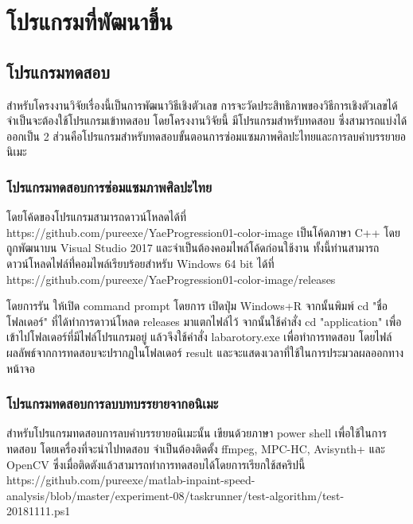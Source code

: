 \chapter{โปรแกรมที่พัฒนาขึ้น}
\section{โปรแกรมทดสอบ}
\hspace{1cm} สำหรับโครงงานวิจัยเรื่องนี้เป็นการพัฒนาวิธีเชิงตัวเลข การจะวัดประสิทธิภาพของวิธีการเชิงตัวเลขได้ จำเป็นจะต้องใช้โปรแกรมเข้าทดสอบ โดยโครงงานวิจัยนี้ มีโปรแกรมสำหรับทดสอบ ซึ่งสามารถแบ่งได้ออกเป็น 2 ส่วนคือโปรแกรมสำหรับทดสอบขั้นตอนการซ่อมแซมภาพศิลปะไทยและการลบคำบรรยายอนิเมะ
\subsection{โปรแกรมทดสอบการซ่อมแซมภาพศิลปะไทย}
\hspace{1cm} โดยโค้ดของโปรแกรมสามารถดาวน์โหลดได้ที่ https://github.com/pureexe/YaeProgression01-color-image เป็นโค้ดภาษา C++ โดยถูกพัฒนาบน Visual Studio 2017 และจำเป็นต้องคอมไพล์โค้ดก่อนใช้งาน ทั้งนี้ท่านสามารถดาวน์โหลดไฟล์ที่่คอมไพล์เรียบร้อยสำหรับ Windows 64 bit ได้ที่ https://github.com/pureexe/YaeProgression01-color-image/releases

\hspace{1cm} โดยการรัน ให้เปิด command prompt โดยการ เปิดปุ่ม Windows+R จากนั้นพิมพ์ cd "ชื่อโฟลเดอร์" ที่ได้ทำการดาวน์โหลด releases มาแตกไฟล์ไว้ จากนั้นใช้คำสั่ง cd "application" เพื่อเข้าไปโฟลเดอร์ที่มีไฟล์โปรแกรมอยู่ แล้วจึงใช้คำสั่ง labarotory.exe เพื่อทำการทดสอบ โดยไฟล์ผลลัพธ์จากการทดสอบจะปรากฏในโฟลเดอร์ result และจะแสดงเวลาที่ใช้ในการประมวลผลออกทางหน้าจอ



\subsection{โปรแกรมทดสอบการลบบทบรรยายจากอนิเมะ}
\hspace{1cm} สำหรับโปรแกรมทดสอบการลบคำบรรยายอนิเมะนั้น เขียนด้วยภาษา power shell เพื่อใช้ในการทดสอบ โดยเครื่องที่จะนำไปทดสอบ จำเป็นต้องติดตั้ง ffmpeg, MPC-HC, Avisynth+ และ OpenCV ซึ่งเมื่อติดตังแล้วสามารถทำการทดสอบได้โดยการเรียกใช้สคริปนี้ https://github.com/pureexe/matlab-inpaint-speed-analysis/blob/master/experiment-08/taskrunner/test-algorithm/test-20181111.ps1



